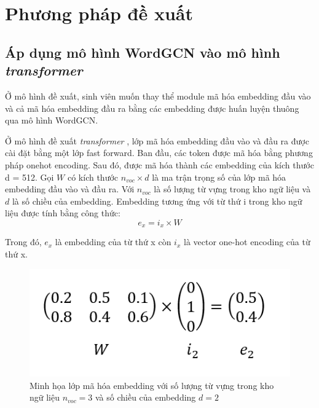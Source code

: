 \chapter{Phương pháp đề xuất}

\section{Áp dụng mô hình WordGCN vào mô hình  \textit{transformer} }

Ở mô hình đề xuất, sinh viên muốn thay thể module mã hóa embedding đầu vào và cả mã hóa embedding đầu ra bằng các embedding được huấn luyện thuông qua mô hình WordGCN.

Ở mô hình đề xuất  \textit{transformer} , lớp mã hóa embedding đầu vào và đầu ra được cài đặt bằng một lớp fast forward. Ban đầu, các token được mã hóa bằng phương pháp onehot encoding. Sau đó, được mã hóa thành các embedding của kích thước d = 512. 
Gọi $W$ có kích thước $n_{voc} \times d$ là ma trận trọng số của lớp mã hóa embedding đầu vào và đầu ra. Với $n_{voc}$ là số lượng từ vựng trong kho ngữ liệu và $d$ là số chiều của embedding. Embedding tương ứng với từ thứ i trong kho ngữ liệu được tính bằng công thức:
\begin{equation*}
	e_x = i_x \times W
\end{equation*}

Trong đó, $e_x$ là embedding của từ thứ x còn $i_x$ là vector one-hot encoding của từ thứ x.

\begin{figure}[H]
    \begin{center}
        \includegraphics[scale=0.8]{images/original_input_embedding}
        \caption{Minh họa lớp mã hóa embedding với số lượng từ vựng trong kho ngữ liệu $n_{voc} = 3$ và số chiều của embedding $d = 2$}
        \label{fig:original-input-embedding}
    \end{center}
\end{figure}

